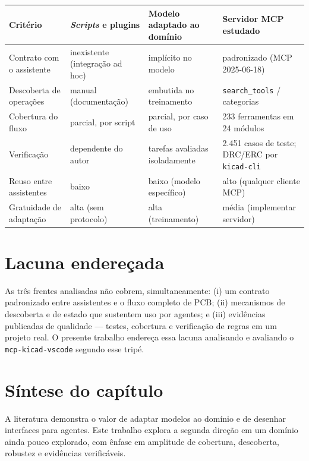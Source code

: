 \begin{quadro}[htbp]
\centering
\small
\caption{Comparação entre abordagens de automação/integração para o fluxo de
PCB no KiCad.}
\label{qua:comparativo}
\begin{tabular}{@{}p{3.4cm}p{3.4cm}p{3.4cm}p{3.4cm}@{}}
\toprule
\textbf{Critério} & \textbf{\emph{Scripts} e plugins} & \textbf{Modelo adaptado ao domínio} & \textbf{Servidor MCP estudado} \\
\midrule
Contrato com o assistente & inexistente (integração ad hoc) & implícito no modelo & padronizado (MCP 2025-06-18) \\
Descoberta de operações & manual (documentação) & embutida no treinamento & \texttt{search\_tools} / categorias \\
Cobertura do fluxo & parcial, por script & parcial, por caso de uso & 233 ferramentas em 24 módulos \\
Verificação & dependente do autor & tarefas avaliadas isoladamente & 2.451 casos de teste; DRC/ERC por \texttt{kicad-cli} \\
Reuso entre assistentes & baixo & baixo (modelo específico) & alto (qualquer cliente MCP) \\
Gratuidade de adaptação & alta (sem protocolo) & alta (treinamento) & média (implementar servidor) \\
\bottomrule
\end{tabular}
\end{quadro}

\section{Lacuna endereçada}

As três frentes analisadas não cobrem, simultaneamente: (i) um contrato
padronizado entre assistentes e o fluxo completo de PCB; (ii) mecanismos de
descoberta e de estado que sustentem uso por agentes; e (iii) evidências
publicadas de qualidade --- testes, cobertura e verificação de regras em um
projeto real. O presente trabalho endereça essa lacuna analisando e
avaliando o \texttt{mcp-kicad-vscode} segundo esse tripé.

\section{Síntese do capítulo}

A literatura demonstra o valor de adaptar modelos ao domínio e de desenhar
interfaces para agentes. Este trabalho explora a segunda direção em um
domínio ainda pouco explorado, com ênfase em amplitude de cobertura,
descoberta, robustez e evidências verificáveis.
